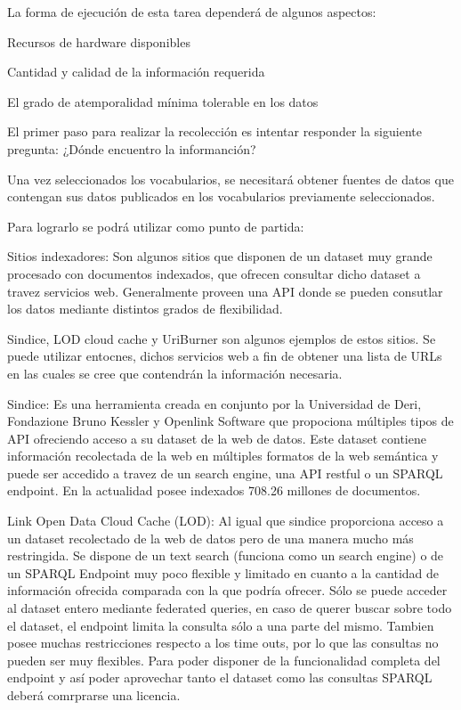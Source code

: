 La forma de ejecución de esta tarea dependerá de algunos aspectos:

Recursos de hardware disponibles

Cantidad y calidad de la información requerida

El grado de atemporalidad mínima tolerable en los datos

El primer paso para realizar la recolección es intentar responder la siguiente pregunta: ¿Dónde encuentro la informanción?

Una vez seleccionados los vocabularios, se necesitará obtener fuentes de datos que contengan sus datos publicados en los vocabularios previamente seleccionados.
 
Para lograrlo se podrá utilizar como punto de partida:

Sitios indexadores: Son algunos sitios que disponen de un dataset muy grande procesado con documentos indexados, que ofrecen consultar dicho 
dataset a travez servicios web. Generalmente proveen una API donde se pueden consutlar los datos mediante distintos grados de flexibilidad.

Sindice, LOD cloud cache y UriBurner son algunos ejemplos de estos sitios. Se puede utilizar entocnes, dichos servicios web a fin
de obtener una lista de URLs en las cuales se cree que contendrán la información necesaria.

Sindice: Es una herramienta creada en conjunto por la Universidad de Deri,  Fondazione Bruno Kessler y Openlink Software que propociona múltiples tipos de API ofreciendo acceso a su dataset de la web de datos. Este dataset contiene información recolectada de la web en múltiples formatos de la web semántica y puede ser accedido a travez de un search engine, una API restful o un SPARQL endpoint.  
En la actualidad posee indexados 708.26 millones de documentos.

Link Open Data Cloud Cache (LOD): Al igual que sindice proporciona acceso a un dataset recolectado de la web de datos pero de una manera mucho más restringida. Se dispone de un text search (funciona como un search engine) o de un SPARQL Endpoint muy poco flexible y limitado en cuanto a la cantidad de información ofrecida comparada con la que podría ofrecer. Sólo se puede acceder al dataset entero mediante federated queries, en caso de querer buscar sobre todo el dataset, el endpoint limita la consulta sólo a una parte del mismo. Tambien posee muchas restricciones respecto a los time outs, por lo que las consultas no pueden ser muy flexibles.
Para poder disponer de la funcionalidad completa del endpoint y así poder aprovechar tanto el dataset como las consultas SPARQL deberá comrprarse una licencia.

